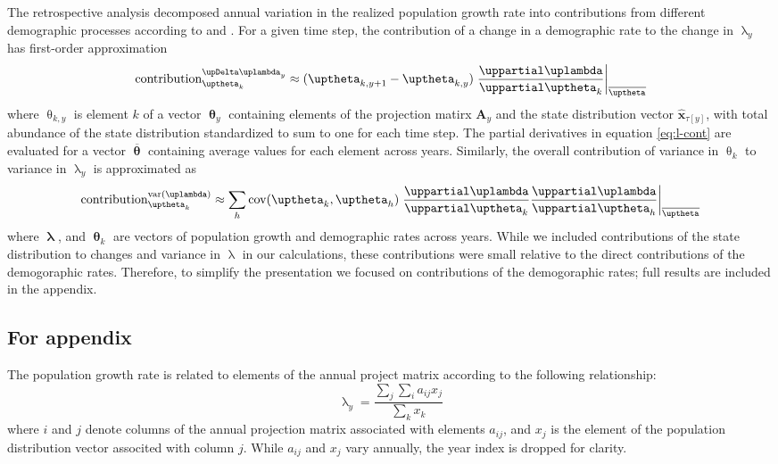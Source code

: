 {The retrospective analysis decomposed annual variation 
in the realized population growth rate 
into contributions from different demographic processes 
according to \cite{koons2016life} and \cite{koons2017understanding}.
For a given time step, 
the contribution of a change in a demographic rate to the change in $\uplambda_y$
has first-order approximation
%
\begin{equation} \label{eq:l-cont}
\text{contribution}^{\upDelta \uplambda_y}_{\uptheta_k} \approx
(\uptheta_{k,y+1} - \uptheta_{k,y})
\left.\frac{\uppartial\uplambda}{\uppartial\uptheta_k}
\right\vert_{\overline{\boldsymbol\uptheta}}
\end{equation}
%
where $\uptheta_{k,y}$ is element $k$ of a vector $\boldsymbol\uptheta_y$ 
containing elements of the projection matirx $\mathbf{A}_y$ and 
the state distribution vector $\hat{\mathbf{x}}_{\tau[y]}$, 
with total abundance of the state distribution 
standardized to sum to one for each time step.
The partial derivatives in equation \ref{eq:l-cont}
are evaluated for a vector $\overline{\boldsymbol\uptheta}$
containing average values for each element across years.
Similarly, the overall contribution of variance in $\uptheta_k$ 
to variance in $\uplambda_y$ is approximated as 
%
\begin{equation} \label{eq:l-var}
\text{contribution}^{\text{var}(\boldsymbol\uplambda)}_{\uptheta_k} \approx
\sum_{h}\text{cov}(\boldsymbol\uptheta_k, \boldsymbol\uptheta_h)
\left.\frac{\uppartial \uplambda}{\uppartial \uptheta_k}
\frac{\uppartial\uplambda}{\uppartial\uptheta_h}
\right\vert_{\overline{\boldsymbol\uptheta}}
\end{equation}
%
where $\boldsymbol\uplambda$, and $\boldsymbol\uptheta_k$ are vectors
of population growth and demographic rates across years.
While we included contributions of the state distribution 
to changes and variance in $\uplambda$ in our calculations,
these contributions were small relative to the direct contributions 
of the demogoraphic rates.
Therefore, to simplify the presentation we focused on contributions of the demogoraphic rates; 
full results are included in the appendix.


\subsection*{For appendix}

The population growth rate is related to elements of the annual project matrix
according to the following relationship:
%
\begin{equation} \label{eq:lam-A}
\uplambda_y = \frac{\sum_{j}\sum_{i}a_{ij}x_j}{\sum_{k}x_k}
\end{equation}
%
where $i$ and $j$ denote columns of the annual projection matrix associated with elements
$a_{ij}$,
and $x_j$ is the element of the population distribution vector associted with column $j$.
While $a_{ij}$ and $x_j$ vary annually, the year index is dropped for clarity.

}

